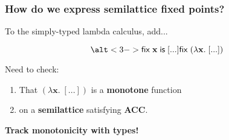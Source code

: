 \documentclass{beamer}
\newcommand{\m}[1]{\ensuremath{\mathbf{#1}}}
\newcommand{\ms}{\mathsf}
\begin{document}

\begin{frame}
  \frametitle{How do we express semilattice fixed points?}

  To the simply-typed lambda calculus, add...\pause

  {\huge\[ \alt<3->{\ms{fix}\;\m{x}\;\ms{is}\;[...]}
                   {\ms{fix}\;(\lambda \m{x}.\; [...])} \]}\pause\pause

  Need to check:
  \begin{enumerate}
  \item That $(\lambda \m{x}.\; [...])$ is a \textbf{monotone} function
  \item \color{gray} on a \textbf{semilattice} satisfying \textbf{ACC}.
  \end{enumerate}

\end{frame}

\begin{frame}
  \begin{center}
    \huge\bf Track monotonicity with types!
  \end{center}
\end{frame}
\end{document}
